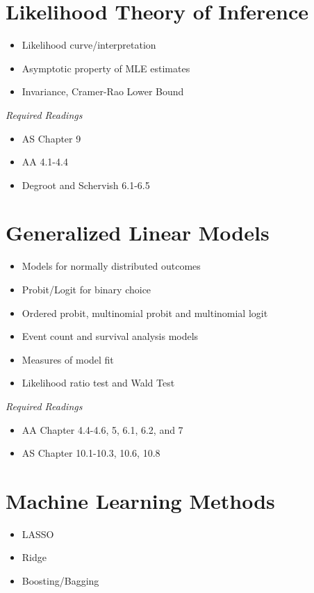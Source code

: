 \documentclass{article}
\begin{document}
\section{Likelihood Theory of Inference}
\begin{itemize}
\item Likelihood curve/interpretation
\item Asymptotic property of MLE estimates
\item Invariance, Cramer-Rao Lower Bound
\end{itemize}

\textit{Required Readings}
\begin{itemize}
\item AS Chapter 9
\item AA 4.1-4.4
\item Degroot and Schervish 6.1-6.5 
\end{itemize}

\section{Generalized Linear Models}
\begin{itemize}
\item Models for normally distributed outcomes
\item Probit/Logit for binary choice
\item Ordered probit, multinomial probit and multinomial logit
\item Event count and survival analysis models
\item Measures of model fit 
\item Likelihood ratio test and Wald Test
\end{itemize}
\textit{Required Readings}
\begin{itemize}
\item AA Chapter 4.4-4.6, 5, 6.1, 6.2, and 7
\item AS Chapter 10.1-10.3, 10.6, 10.8
\end{itemize}

\section{Machine Learning Methods}
\begin{itemize}
\item LASSO
\item Ridge
\item Boosting/Bagging
\end{itemize}
\end{document}
